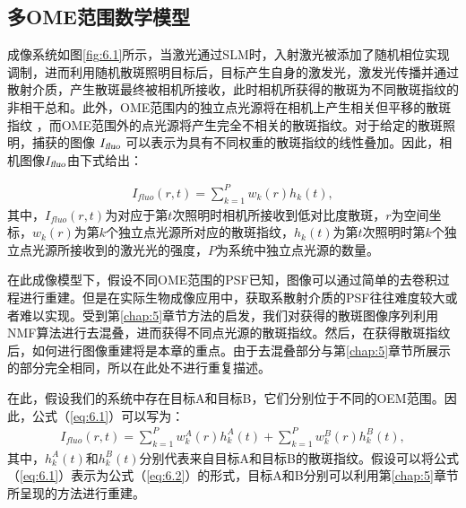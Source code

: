 \subsection{多OME范围数学模型}

成像系统如图\ref{fig:6.1}所示，当激光通过SLM时，入射激光被添加了随机相位实现调制，进而利用随机散斑照明目标后，目标产生自身的激发光，激发光传播并通过散射介质，产生散斑最终被相机所接收，此时相机所获得的散斑为不同散斑指纹的非相干总和。此外，OME范围内的独立点光源将在相机上产生相关但平移的散斑指纹 \cite{Freund1988}，而OME范围外的点光源将产生完全不相关的散斑指纹。对于给定的散斑照明，捕获的图像 $I_{\textsl{fluo}}$ 可以表示为具有不同权重的散斑指纹的线性叠加。因此，相机图像$I_{\textsl{fluo}}$由下式给出：

\begin{equation}
\begin{aligned}
I_{fluo}(r,t) = \sum^{P}_{k=1} w_{k}(r) h_{k}(t),
\label{eq:6.1}
\end{aligned}
\end{equation}
其中，$I_{fluo}(r,t)$为对应于第$t$次照明时相机所接收到低对比度散斑，$r$为空间坐标，$w_{k}(r)$为第$k$个独立点光源所对应的散斑指纹，$h_{k}(t)$为第$t$次照明时第$k$个独立点光源所接收到的激光光的强度，$P$为系统中独立点光源的数量。

在此成像模型下，假设不同OME范围的PSF已知，图像可以通过简单的去卷积过程进行重建。但是在实际生物成像应用中，获取系散射介质的PSF往往难度较大或者难以实现。受到第\ref{chap:5}章节方法的启发，我们对获得的散斑图像序列利用NMF算法进行去混叠，进而获得不同点光源的散斑指纹。然后，在获得散斑指纹后，如何进行图像重建将是本章的重点。由于去混叠部分与第\ref{chap:5}章节所展示的部分完全相同，所以在此处不进行重复描述。

在此，假设我们的系统中存在目标A和目标B，它们分别位于不同的OEM范围。因此，公式（\ref{eq:6.1}）可以写为：
\begin{equation}
\begin{aligned}
I_{fluo}(r,t) = \sum^{P}_{k=1} w_{k}^{A}(r) h_{k}^{A}(t)+\sum^{P}_{k=1} w_{k}^{B}(r) h_{k}^{B}(t),
\label{eq:6.2}
\end{aligned}
\end{equation}
其中，$h_{k}^{A}(t)$和$h_{k}^{B}(t)$分别代表来自目标A和目标B的散斑指纹。假设可以将公式（\ref{eq:6.1}）表示为公式（\ref{eq:6.2}）的形式，目标A和B分别可以利用第\ref{chap:5}章节所呈现的方法进行重建。

